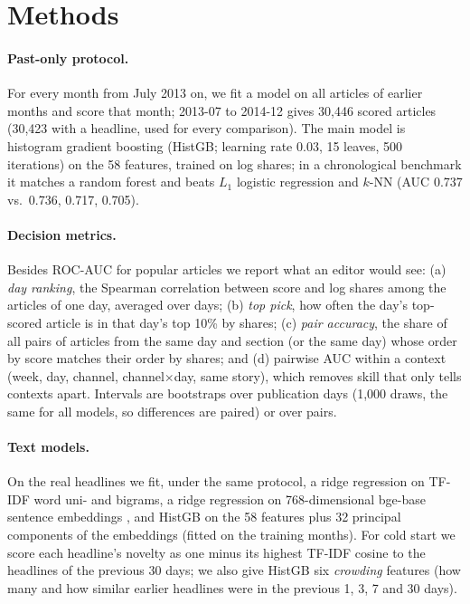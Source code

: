 \documentclass[10pt,a4paper,twocolumn]{article}
\begin{document}
\section{Methods}
\label{sec:method}
\paragraph{Past-only protocol.} For every month from July 2013 on, we fit a model on all articles of earlier
months and score that month; 2013-07 to 2014-12 gives 30{,}446 scored articles (30{,}423 with a headline, used for every comparison). The main model is histogram
gradient boosting \citep{friedman2001,ke2017} (HistGB; learning rate 0.03, 15 leaves, 500 iterations) on the 58
features, trained on log shares; in a chronological benchmark it matches a random forest and beats $L_1$
logistic regression and $k$-NN (AUC 0.737 vs.\ 0.736, 0.717, 0.705).

\paragraph{Decision metrics.} Besides ROC-AUC for popular articles we report what an editor would see:
(a) \emph{day ranking}, the Spearman correlation between score and log shares among the articles of one day,
averaged over days; (b) \emph{top pick}, how often the day's top-scored article is in that day's top 10\% by
shares; (c) \emph{pair accuracy}, the share of all pairs of articles from the same day and section (or the same
day) whose order by score matches their order by shares; and (d) pairwise AUC within a context (week, day,
channel, channel$\times$day, same story), which removes skill that only tells contexts apart. Intervals are
bootstraps over publication days (1{,}000 draws, the same for all models, so differences are paired) or over pairs.

\paragraph{Text models.} On the real headlines we fit, under the same protocol, a ridge regression on TF-IDF word
uni- and bigrams, a ridge regression on 768-dimensional bge-base sentence embeddings \citep{xiao2024bge}, and
HistGB on the 58 features plus 32 principal components of the embeddings (fitted on the training months). For
cold start we score each headline's novelty as one minus its highest TF-IDF cosine to the headlines of the
previous 30 days; we also give HistGB six \emph{crowding} features (how many and how similar earlier headlines were
in the previous 1, 3, 7 and 30 days).
\end{document}
